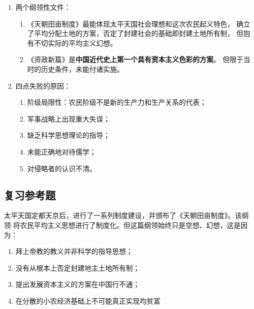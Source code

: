 \documentclass[10pt, UTF8]{book} %
\begin{document}
\begin{mdframed}[frametitle={太平天国运动：旧式农民起义的最高峰}]
    \begin{enumerate}[label=\textup{\arabic*}${}^\circ$, itemsep=0pt]
        \item 两个纲领性文件：
        \begin{enumerate}[itemsep=0pt]
            \item 《天朝田亩制度》最能体现太平天国社会理想和这次农民起义特色，
            确立了平均分配土地的方案，否定了封建社会的基础即封建土地所有制，
            但抱有不切实际的平均主义幻想。
            \item 《资政新篇》是\textbf{中国近代史上第一个具有资本主义色彩的方案}。
            但限于当时的历史条件，未能付诸实施。            
        \end{enumerate}
        \item 四点失败的原因：
        \begin{enumerate}[itemsep=0pt]
            \item 阶级局限性：农民阶级不是新的生产力和生产关系的代表；
            \item 军事战略上出现重大失误；
            \item 缺乏科学思想理论的指导；
            \item 未能正确地对待儒学；
            \item 对侵略者的认识不清。
        \end{enumerate}
    \end{enumerate}
\end{mdframed}

\subsection{复习参考题}

\begin{example}
    太平天国定都天京后，进行了一系列制度建设，并颁布了《天朝田亩制度》。该纲领
    将农民平均主义思想进行了制度化。但这篇纲领始终只是空想、幻想，这是因为：
    \begin{enumerate}[label=\Alph*., itemsep=0pt]
    \item 拜上帝教的教义并非科学的指导思想；
    \item 没有从根本上否定封建地主土地所有制；
    \item 提出发展资本主义的方案在中国行不通；
    \item 在分散的小农经济基础上不可能真正实现均贫富
    \end{enumerate}
\end{example}
\end{document}
